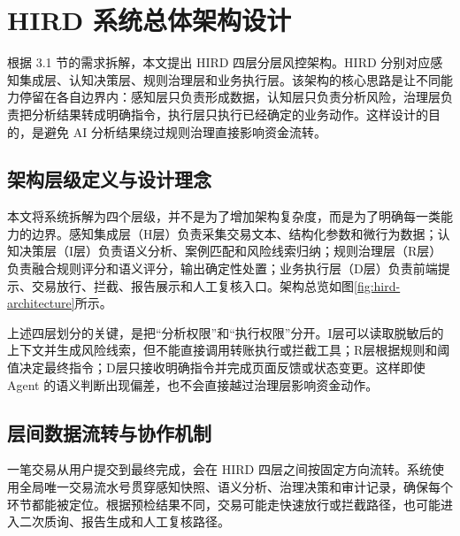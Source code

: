 \documentclass{xduugthesis}
\begin{document}
\section{HIRD 系统总体架构设计}

根据 3.1 节的需求拆解，本文提出 HIRD 四层分层风控架构。HIRD 分别对应感知集成层、认知决策层、规则治理层和业务执行层。该架构的核心思路是让不同能力停留在各自边界内：感知层只负责形成数据，认知层只负责分析风险，治理层负责把分析结果转成明确指令，执行层只执行已经确定的业务动作。这样设计的目的，是避免 AI 分析结果绕过规则治理直接影响资金流转。

\subsection{架构层级定义与设计理念}

本文将系统拆解为四个层级，并不是为了增加架构复杂度，而是为了明确每一类能力的边界。感知集成层（H层）负责采集交易文本、结构化参数和微行为数据；认知决策层（I层）负责语义分析、案例匹配和风险线索归纳；规则治理层（R层）负责融合规则评分和语义评分，输出确定性处置；业务执行层（D层）负责前端提示、交易放行、拦截、报告展示和人工复核入口。架构总览如图\ref{fig:hird-architecture}所示。


上述四层划分的关键，是把“分析权限”和“执行权限”分开。I层可以读取脱敏后的上下文并生成风险线索，但不能直接调用转账执行或拦截工具；R层根据规则和阈值决定最终指令；D层只接收明确指令并完成页面反馈或状态变更。这样即使 Agent 的语义判断出现偏差，也不会直接越过治理层影响资金动作。

\subsection{层间数据流转与协作机制}

一笔交易从用户提交到最终完成，会在 HIRD 四层之间按固定方向流转。系统使用全局唯一交易流水号贯穿感知快照、语义分析、治理决策和审计记录，确保每个环节都能被定位。根据预检结果不同，交易可能走快速放行或拦截路径，也可能进入二次质询、报告生成和人工复核路径。
\end{document}
